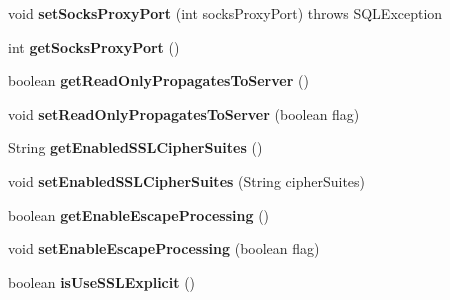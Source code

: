 \begin{DoxyCompactItemize}
$$void {\bfseries set\+Socks\+Proxy\+Port} (int socks\+Proxy\+Port)  throws S\+Q\+L\+Exception 
\item 
\mbox{\label{classcom_1_1mysql_1_1jdbc_1_1jdbc2_1_1optional_1_1_connection_wrapper_a3b1d3d5ca3a6d1db512bf765e6e31032}} 
int {\bfseries get\+Socks\+Proxy\+Port} ()
\item 
\mbox{\label{classcom_1_1mysql_1_1jdbc_1_1jdbc2_1_1optional_1_1_connection_wrapper_a89e3d2027627ec986127f0f52d806af6}} 
boolean {\bfseries get\+Read\+Only\+Propagates\+To\+Server} ()
\item 
\mbox{\label{classcom_1_1mysql_1_1jdbc_1_1jdbc2_1_1optional_1_1_connection_wrapper_a7807c6f5ec48da492b5540d1a9927e61}} 
void {\bfseries set\+Read\+Only\+Propagates\+To\+Server} (boolean flag)
\item 
\mbox{\label{classcom_1_1mysql_1_1jdbc_1_1jdbc2_1_1optional_1_1_connection_wrapper_aa0c719ae166f9f001cb1cfd8922a55da}} 
String {\bfseries get\+Enabled\+S\+S\+L\+Cipher\+Suites} ()
\item 
\mbox{\label{classcom_1_1mysql_1_1jdbc_1_1jdbc2_1_1optional_1_1_connection_wrapper_afbd0655f65a5b081a502ebdb30cc5028}} 
void {\bfseries set\+Enabled\+S\+S\+L\+Cipher\+Suites} (String cipher\+Suites)
\item 
\mbox{\label{classcom_1_1mysql_1_1jdbc_1_1jdbc2_1_1optional_1_1_connection_wrapper_ad121668077ec96b5ed4a204837d28a89}} 
boolean {\bfseries get\+Enable\+Escape\+Processing} ()
\item 
\mbox{\label{classcom_1_1mysql_1_1jdbc_1_1jdbc2_1_1optional_1_1_connection_wrapper_a7ef014e364c7b4d11a5bef237e086194}} 
void {\bfseries set\+Enable\+Escape\+Processing} (boolean flag)
\item 
\mbox{\label{classcom_1_1mysql_1_1jdbc_1_1jdbc2_1_1optional_1_1_connection_wrapper_af0b59293b5b7bb706f613af467d46386}} 
boolean {\bfseries is\+Use\+S\+S\+L\+Explicit} ()
\end{DoxyCompactItemize}
